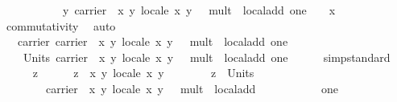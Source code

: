 \begin{isabellebody}
\ \ \ \ \ \ \ \ \ \ \ y\ {\isasymotimes}\isactrlbsub {\isasymlparr}carrier\ {\isacharequal}\ {\isacharbraceleft}{\isacharparenleft}x{\isacharcomma}\ y{\isacharparenright}{\isachardot}\ local{\isachardot}e\ x\ y\ {\isacharequal}\ {}{\isacharbraceright}{\isacharcomma}\ mult\ {\isacharequal}\ local{\isachardot}add{\isacharcomma}\ one\ {\isacharequal}\ {\isacharparenleft}{}{\isacharcomma}\ {}{\isacharparenright}{\isasymrparr}\isactrlesub \ x{\isachardoublequoteclose}\isanewline
\ \ \ \ \isamarkupfalse%
\ commutativity\ \isamarkupfalse%
\ auto\isanewline
{}\isamarkupfalse%
\isanewline
\ \ \isamarkupfalse%
\ {\isachardoublequoteopen}\isanewline
\ \ \ carrier\ {\isasymlparr}carrier\ {\isacharequal}\ {\isacharbraceleft}{\isacharparenleft}x{\isacharcomma}\ y{\isacharparenright}{\isachardot}\ local{\isachardot}e\ x\ y\ {\isacharequal}\ {}{\isacharbraceright}{\isacharcomma}\ mult\ {\isacharequal}\ local{\isachardot}add{\isacharcomma}\ one\ {\isacharequal}\ {\isacharparenleft}{}{\isacharcomma}\ {}{\isacharparenright}{\isasymrparr}\isanewline
\ \ \ {\isasymsubseteq}\ Units\ {\isasymlparr}carrier\ {\isacharequal}\ {\isacharbraceleft}{\isacharparenleft}x{\isacharcomma}\ y{\isacharparenright}{\isachardot}\ local{\isachardot}e\ x\ y\ {\isacharequal}\ {}{\isacharbraceright}{\isacharcomma}\ mult\ {\isacharequal}\ local{\isachardot}add{\isacharcomma}\ one\ {\isacharequal}\ {\isacharparenleft}{}{\isacharcomma}\ {}{\isacharparenright}{\isasymrparr}{\isachardoublequoteclose}\isanewline
\ \ \isamarkupfalse%
{\isacharparenleft}simp{\isacharcomma}standard{\isacharparenright}\isanewline
\ \ \ \ \isamarkupfalse%
\ z\isanewline
\ \ \ \ \isamarkupfalse%
\ {\isachardoublequoteopen}z\ {\isasymin}\ {\isacharbraceleft}{\isacharparenleft}x{\isacharcomma}\ y{\isacharparenright}{\isachardot}\ local{\isachardot}e\ x\ y\ {\isacharequal}\ {}{\isacharbraceright}{\isachardoublequoteclose}\isanewline
\ \ \ \ \isamarkupfalse%
\ {\isachardoublequoteopen}z\ {\isasymin}\ Units\isanewline
\ \ \ \ \ \ \ \ {\isasymlparr}carrier\ {\isacharequal}\ {\isacharbraceleft}{\isacharparenleft}x{\isacharcomma}\ y{\isacharparenright}{\isachardot}\ local{\isachardot}e\ x\ y\ {\isacharequal}\ {}{\isacharbraceright}{\isacharcomma}\ mult\ {\isacharequal}\ local{\isachardot}add{\isacharcomma}\isanewline
\ \ \ \ \ \ \ \ \ \ \ one\ {\isacharequal}\ {\isacharparenleft}{}{\isacharcomma}\ {}{\isacharparenright}{\isasymrparr}{\isachardoublequoteclose}\ \isanewline

\end{isabellebody}

